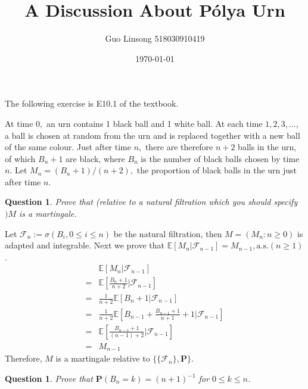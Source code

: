 \documentclass{article}
\title{A Discussion About Pólya Urn}
\author{Guo Linsong 518030910419}
\date{\today}
\newtheorem{question}[theorem]{Question}
\begin{document}
\maketitle


\begin{tcolorbox}
    \begin{problem}
    The following exercise is E10.1 of the textbook.

      At time $0,$ an urn contains 1 black ball and 1 white ball. At each time $1,2,3, \ldots,$ a ball is chosen at random from the urn and is replaced together with a new ball of the same colour. Just after time $n,$ there are therefore $n+2$ balls in the urn, of which $B_{n}+1$ are black, where $B_{n}$ is the number of black balls chosen by time $n$.  Let $M_{n}=\left(B_{n}+1\right) /(n+2),$ the proportion of black balls in the urn just after time $n .$
   \end{problem}
\end{tcolorbox}

\begin{question}
Prove that (relative to a natural filtration which you should specify $) M$ is a martingale.
\end{question}

\begin{solution}
Let $\mathcal{F}_{n}:=\sigma(B_i,0\le i \le n)$ be the natural filtration, then $M=(M_n:n\ge 0)$ is adapted and integrable. Next we prove that $\mathbb{E}[M_n|\mathcal{F}_{n-1}]=M_{n-1},\text{a.s.}(n\ge 1)$.
\begin{equation*}
    \begin{array}{rl}
        & \mathbb{E}\left[M_n|\mathcal{F}_{n-1}\right] \\
     =  & \mathbb{E}\left[\frac{B_n+1}{n+2}\big|\mathcal{F}_{n-1}\right] \\
     =  & \frac{1}{n+2}\mathbb{E}\left[B_{n}+1\big|\mathcal{F}_{n-1}\right] \\
     =  & \frac{1}{n+2}\mathbb{E}\left[B_{n-1}+\frac{B_{n-1}+1}{n+1}+1\big|\mathcal{F}_{n-1}\right] \\
     =  & \mathbb{E}\left[\frac{B_{n-1}+1}{(n-1)+2}\big|\mathcal{F}_{n-1}\right] \\
     = & M_{n-1}
    \end{array}
\end{equation*}
Therefore, $M$ is a martingale relative to $\{\{\mathcal{F}_n\},\mathbf{P}\}$.
\end{solution}


\begin{question}
Prove that $\mathbf{P}\left(B_{n}=k\right)=(n+1)^{-1}$  for $0 \leq k \leq n$.
\end{question}
\end{document}
